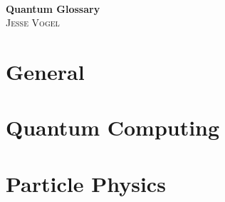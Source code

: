 \documentclass[10pt]{report}
\begin{document}
\thispagestyle{empty}

\begin{center}
    \; \\ \vspace{4cm} \textbf{\Huge Quantum Glossary}
    \\ \vspace{2cm}
    \textsc{Jesse Vogel}
\end{center}

\newpage

{
    \tableofcontents
}

\newcommand{\cat}{}

\chapter{General}
\renewcommand{\cat}{GEN}


\chapter{Quantum Computing}
\renewcommand{\cat}{COM}




\chapter{Particle Physics}
\renewcommand{\cat}{PAR}

\end{document}
